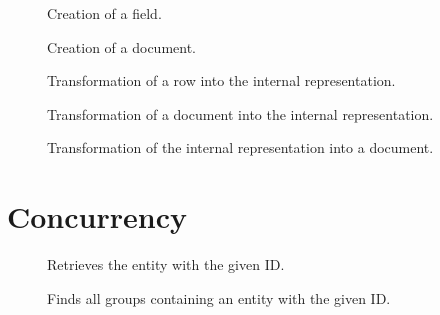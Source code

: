\documentclass[12pt,letterpaper,oneside,notitlepage]{report}
\theoremstyle{definition}
\begin{document}
		\begin{figure}[ht!]
			\caption{Creation of a field.}
			\label{src:molly-datatypes-entity-field}
		\end{figure}
		
		\begin{figure}[ht!]
			\caption{Creation of a document.}
			\label{src:molly-datatypes-entity-document}
		\end{figure}
		
		\begin{figure}[ht!]
			\caption{Transformation of a row into the internal representation.}
			\label{src:molly-datatypes-entity-row-data}
		\end{figure}
		
		\begin{figure}[ht!]
			\caption{Transformation of a document into the internal representation.}
			\label{src:molly-datatypes-entity-doc-data}
		\end{figure}
		
		\begin{figure}[ht!]
			\caption{Transformation of the internal representation into a document.}
			\label{src:molly-datatypes-entity-data-doc}
		\end{figure}
	
	\chapter{Concurrency}
		\begin{figure}[ht!]
			
			\caption{Retrieves the entity with the given ID.}
			\label{src:molly-algo-common-find-entity-by-id}
		\end{figure}
		
		\begin{figure}[ht!]
			
			\caption{Finds all groups containing an entity with the given ID.}
			\label{src:molly-algo-common-find-group-for-id}
		\end{figure}
		
\end{document}
